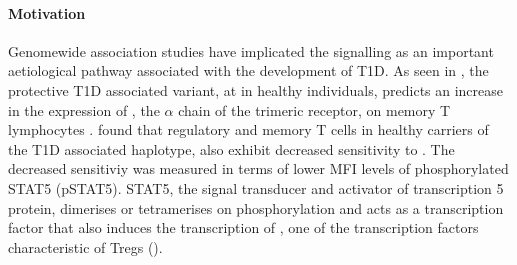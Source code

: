 \paragraph{Motivation}
Genomewide association studies have implicated the  signalling as an important aetiological pathway associated with the development of \gls{T1D}.  
As seen in , the protective T1D associated  variant, at  in healthy individuals, predicts an increase in the expression of , the $\alpha$ chain of the trimeric  receptor, on memory \positive T lymphocytes \citep{Dendrou:2008gc,Dendrou:2009dv}.
\citet{Garg:2012jr} found that regulatory and memory \positive T cells in healthy carriers of the T1D associated  haplotype,
also exhibit decreased sensitivity to .
The decreased sensitiviy was measured in terms of lower MFI levels of phosphorylated STAT5 (pSTAT5).
STAT5, the signal transducer and activator of transcription 5 protein, dimerises or tetramerises on phosphorylation and acts as a transcription factor that also induces the transcription of , one of the transcription factors characteristic of \glspl{Treg} ().

